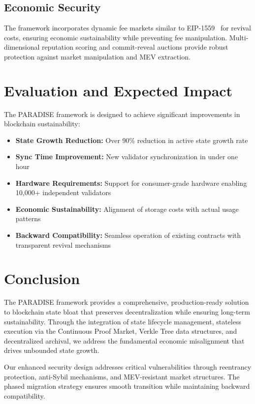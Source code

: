 \documentclass{article}
\begin{document}
\subsection{Economic Security}

The framework incorporates dynamic fee markets similar to EIP-1559~\cite{eip1559} for revival costs, ensuring economic sustainability while preventing fee manipulation. Multi-dimensional reputation scoring and commit-reveal auctions provide robust protection against market manipulation and MEV extraction.

\section{Evaluation and Expected Impact}

The PARADISE framework is designed to achieve significant improvements in blockchain sustainability:

\begin{itemize}
\item \textbf{State Growth Reduction:} Over 90\% reduction in active state growth rate
\item \textbf{Sync Time Improvement:} New validator synchronization in under one hour
\item \textbf{Hardware Requirements:} Support for consumer-grade hardware enabling 10,000+ independent validators
\item \textbf{Economic Sustainability:} Alignment of storage costs with actual usage patterns
\item \textbf{Backward Compatibility:} Seamless operation of existing contracts with transparent revival mechanisms
\end{itemize}

\section{Conclusion}

The PARADISE framework provides a comprehensive, production-ready solution to blockchain state bloat that preserves decentralization while ensuring long-term sustainability. Through the integration of state lifecycle management, stateless execution via the Continuous Proof Market, Verkle Tree data structures, and decentralized archival, we address the fundamental economic misalignment that drives unbounded state growth.

Our enhanced security design addresses critical vulnerabilities through reentrancy protection, anti-Sybil mechanisms, and MEV-resistant market structures. The phased migration strategy ensures smooth transition while maintaining backward compatibility.
\end{document}
